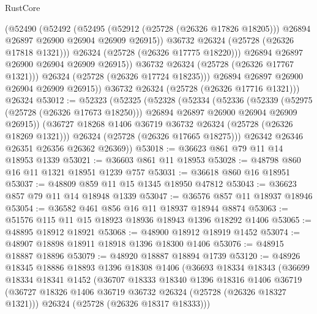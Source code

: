 \begin{lexlean}{RustCore}
\begin{coremodule}
                    (@52490
                      (@52492
                        (@52495
                          (@52912 (@25728 (@26326 @17826 @18205)))
                          @26894
                          @26897
                          @26900
                          @26904
                          @26909
                          @26915))
                      @36732
                      @26324
                      (@25728 (@26326 @17818 @1321)))
                    @26324
                    (@25728 (@26326 @17775 @18220)))
                  @26894
                  @26897
                  @26900
                  @26904
                  @26909
                  @26915))
              @36732
              @26324
              (@25728 (@26326 @17767 @1321)))
            @26324
            (@25728 (@26326 @17724 @18235)))
          @26894
          @26897
          @26900
          @26904
          @26909
          @26915))
      @36732
      @26324
      (@25728 (@26326 @17716 @1321)))
    @26324
@53012 := @52323
    (@52325
      (@52328
        (@52334
          (@52336
            (@52339
              (@52975 (@25728 (@26326 @17673 @18250)))
              @26894
              @26897
              @26900
              @26904
              @26909
              @26915))
          (@36727 @18268 @1406 @36719 @36732 @26324 (@25728 (@26326 @18269 @1321)))
          @26324
          (@25728 (@26326 @17665 @18275)))
        @26342
        @26346
        @26351
        @26356
        @26362
        @26369))
@53018 := @36623 @861 @79 @11 @14 @18953 @1339
@53021 := @36603 @861 @11 @18953
@53028 := @48798 @860 @16 @11 @1321 @18951 @1239 @757
@53031 := @36618 @860 @16 @18951
@53037 := @48809 @859 @11 @15 @1345 @18950 @47812
@53043 := @36623 @857 @79 @11 @14 @18948 @1339
@53047 := @36576 @857 @11 @18937 @18946
@53054 := @36582 @461 @856 @16 @11 @18937 @18944 @8874
@53063 := @51576 @115 @11 @15 @18923 @18936 @18943 @1396 @18292 @1406
@53065 := @48895 @18912 @18921
@53068 := @48900 @18912 @18919 @1452
@53074 := @48907 @18898 @18911 @18918 @1396 @18300 @1406
@53076 := @48915 @18887 @18896
@53079 := @48920 @18887 @18894 @1739
@53120 := @48926
    @18345
    @18886
    @18893
    @1396
    @18308
    @1406
    (@36693
      @18334
      @18343
      (@36699
        @18334
        @18341
        @1452
        (@36707
          @18333
          @18340
          @1396
          @18316
          @1406
          @36719
          (@36727 @18326 @1406 @36719 @36732 @26324 (@25728 (@26326 @18327 @1321)))
          @26324
          (@25728 (@26326 @18317 @18333)))

\end{coremodule}
\end{lexlean}
